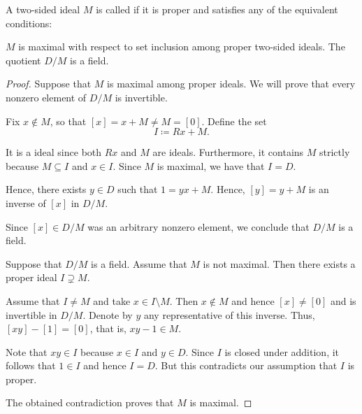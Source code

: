 \begin{definition}\label{def:maximal_ring_ideal}
  A two-sided ideal \( M \) is called  if it is proper and satisfies any of the equivalent conditions:
  \begin{thmenum}
     \( M \) is maximal with respect to set inclusion among proper two-sided ideals.
     The quotient \( D / M \) is a field.
  \end{thmenum}
\end{definition}
\begin{proof}
   Suppose that \( M \) is maximal among proper ideals. We will prove that every nonzero element of \( D / M \) is invertible.

  Fix \( x \not\in M \), so that \( [x] = x + M \neq M = [0] \). Define the set
  \begin{equation*}
    I \coloneqq Rx + M.
  \end{equation*}

  It is a ideal since both \( Rx \) and \( M \) are ideals. Furthermore, it contains \( M \) strictly because \( M \subseteq I \) and \( x \in I \). Since \( M \) is maximal, we have that \( I = D \).

  Hence, there exists \( y \in D \) such that \( 1 = yx + M \). Hence, \( [y] = y + M \) is an inverse of \( [x] \) in \( D / M \).

  Since \( [x] \in D / M \) was an arbitrary nonzero element, we conclude that \( D / M \) is a field.

   Suppose that \( D / M \) is a field. Assume that \( M \) is not maximal. Then there exists a proper ideal \( I \supsetneq M \).

  Assume that \( I \neq M \) and take \( x \in I \setminus M \). Then \( x \not\in M \) and hence \( [x] \neq [0] \) and is invertible in \( D / M \). Denote by \( y \) any representative of this inverse. Thus, \( [xy] - [1] = [0] \), that is, \( xy - 1 \in M \).

  Note that \( xy \in I \) because \( x \in I \) and \( y \in D \). Since \( I \) is closed under addition, it follows that \( 1 \in I \) and hence \( I = D \). But this contradicts our assumption that \( I \) is proper.

  The obtained contradiction proves that \( M \) is maximal.
\end{proof}

